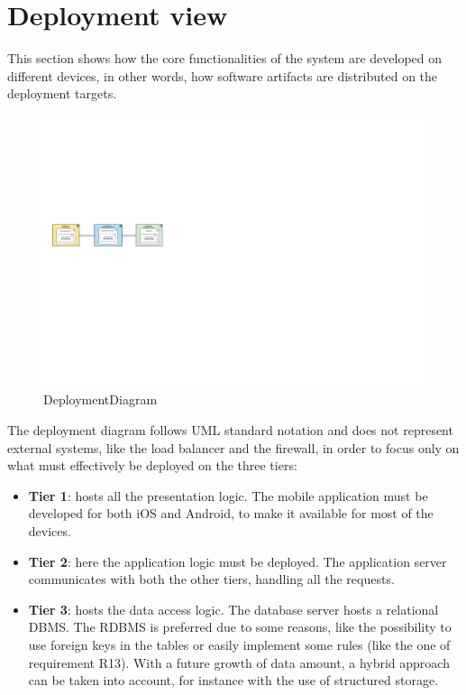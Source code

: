 \documentclass[12pt,a4paper]{report}
\begin{document}
		\section{Deployment view}
This section shows how the core functionalities of the system are developed on different devices, in other words,
how software artifacts are distributed on the deployment targets. 
	\begin{figure}[H]
			\includegraphics[scale = 0.6, center]{DeploymentDiagram}
			\caption{DeploymentDiagram}
	\end{figure}
The deployment diagram follows UML standard notation and does not represent external systems, like the load balancer and the firewall, in order to focus only on what must effectively be deployed on the three tiers:
\begin{itemize}
	\item\textbf{Tier 1}: hosts all the presentation logic. The mobile application must be developed for both iOS
and Android, to make it available for most of the devices. 
	\item\textbf{Tier 2}: here the application logic must be deployed. The application server communicates with both
the other tiers, handling all the requests.
	\item\textbf{Tier 3}: hosts the data access logic. The database server hosts a relational DBMS. The RDBMS is
preferred due to some reasons, like the possibility to use foreign keys in the tables or easily implement some rules
(like the one of requirement R13). With a future growth of data amount, a hybrid approach can be taken into account, for instance with the use of structured storage.
\end{itemize}
\end{document}

